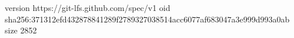 version https://git-lfs.github.com/spec/v1
oid sha256:371312efd432878841289f2789327038514acc6077af683047a3e999d993a0ab
size 2852
